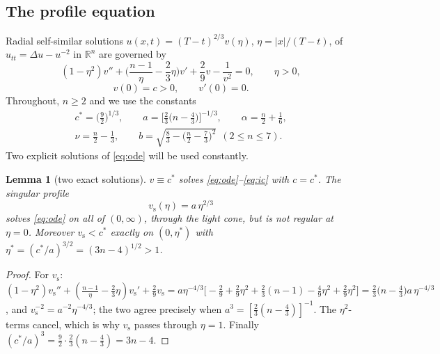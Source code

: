 \documentclass[11pt,a4paper]{amsart}
\newtheorem{lemma}[theorem]{Lemma}
\theoremstyle{definition}
\theoremstyle{remark}
\newcommand{\R}{\mathbb{R}}
\newcommand{\cstar}{c^{*}}
\newcommand{\vs}{v_{\mathrm{s}}}
\begin{document}
\subsection{The profile equation}
Radial self-similar solutions $u(x,t)=(T-t)^{2/3}v(\eta)$, $\eta=|x|/(T-t)$, of $u_{tt}=\Delta u-u^{-2}$ in $\R^n$ are governed by \cite[(2.3)--(2.4)]{GHL22}
\begin{equation}\label{eq:ode}
(1-\eta^2)v''+\Big(\frac{n-1}{\eta}-\frac{2}{3}\eta\Big)v'+\frac{2}{9}v-\frac{1}{v^2}=0,\qquad \eta>0,
\end{equation}
\begin{equation}\label{eq:ic}
v(0)=c>0,\qquad v'(0)=0 .
\end{equation}
Throughout, $n\ge2$ and we use the constants
\begin{equation}\label{eq:constants}
\begin{gathered}
\cstar=\Big(\frac92\Big)^{1/3},\qquad
a=\Big[\frac23\Big(n-\frac43\Big)\Big]^{-1/3},\qquad
\alpha=\frac n2+\frac16,\\
\nu=\frac n2-\frac13,\qquad
b=\sqrt{\frac83-\Big(\frac n2-\frac73\Big)^2}\ \ (2\le n\le7).
\end{gathered}
\end{equation}
Two explicit solutions of \eqref{eq:ode} will be used constantly.

\begin{lemma}[two exact solutions]\label{lem:exact}
$v\equiv\cstar$ solves \eqref{eq:ode}--\eqref{eq:ic} with $c=\cstar$.  The \emph{singular profile}
\begin{equation}\label{eq:vs}
\vs(\eta)=a\,\eta^{2/3}
\end{equation}
solves \eqref{eq:ode} on all of $(0,\infty)$, through the light cone, but is not regular at $\eta=0$.  Moreover $\vs<\cstar$ exactly on $(0,\eta^*)$ with $\eta^*=(\cstar/a)^{3/2}=(3n-4)^{1/2}>1$.
\end{lemma}
\begin{proof}
For $\vs$: $(1-\eta^2)\vs''+(\frac{n-1}{\eta}-\frac23\eta)\vs'+\frac29\vs=a\eta^{-4/3}\big[-\tfrac29+\tfrac29\eta^2+\tfrac23(n-1)-\tfrac49\eta^2+\tfrac29\eta^2\big]=\tfrac23\big(n-\tfrac43\big)a\,\eta^{-4/3}$, and $\vs^{-2}=a^{-2}\eta^{-4/3}$; the two agree precisely when $a^3=[\frac23(n-\frac43)]^{-1}$.  The $\eta^2$-terms cancel, which is why $\vs$ passes through $\eta=1$.  Finally $(\cstar/a)^3=\frac92\cdot\frac23(n-\frac43)=3n-4$.
\end{proof}
\end{document}
